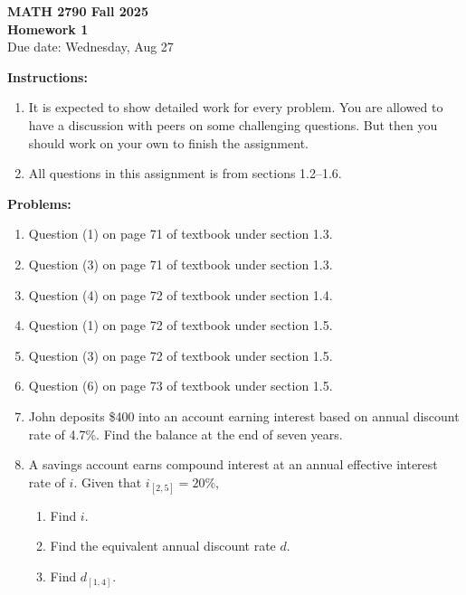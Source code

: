 \documentclass[12pt]{article}
\begin{document}
\begin{center}
\textbf{\Large MATH 2790 Fall 2025}\\[1em]
\textbf{\Large Homework 1}\\[0.5em]
Due date: Wednesday, Aug 27
\end{center}

\bigskip

\textbf{Instructions:}

\begin{enumerate}[label=(\alph*)]
\item It is expected to show detailed work for every problem. You are allowed to have a
discussion with peers on some challenging questions. But then you should work on
your own to finish the assignment.

\item All questions in this assignment is from sections 1.2–1.6.
\end{enumerate}

\bigskip

\textbf{Problems:}

\begin{enumerate}
\item Question (1) on page 71 of textbook under section 1.3.

\item Question (3) on page 71 of textbook under section 1.3.

\item Question (4) on page 72 of textbook under section 1.4.

\item Question (1) on page 72 of textbook under section 1.5.

\item Question (3) on page 72 of textbook under section 1.5.

\item Question (6) on page 73 of textbook under section 1.5.

\item John deposits \$400 into an account earning interest based on annual discount rate of
4.7\%. Find the balance at the end of seven years.

\item A savings account earns compound interest at an annual effective interest rate of $i$.
Given that $i_{[2,5]} = 20\%$,
\begin{enumerate}[label=(\alph*)]
\item Find $i$.
\item Find the equivalent annual discount rate $d$.
\item Find $d_{[1,4]}$.
\end{enumerate}
\end{enumerate}
\end{document}
